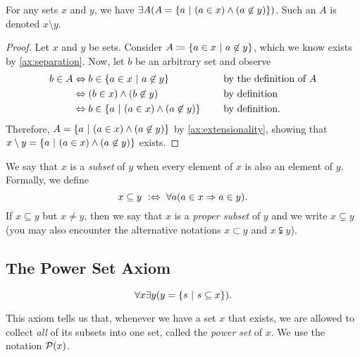 \begin{theorem}
    For any sets \(x\) and \(y\),
    we have \(\exists A \pn*{A = \set*{a \suchthat (a \in x) \meet (a \not \in y)}}\).
    Such an \(A\) is denoted \(x \setminus y\).
\end{theorem}
\begin{proof}
    Let \(x\) and \(y\) be sets.
    Consider \(A \defn \set*{a \in x \suchthat a \not \in y}\),
    which we know exists by \autoref{ax:separation}.
    Now, let \(b\) be an arbitrary set and observe
    \begin{alignat*}{2}
        b \in A &\iff b \in \set*{a \in x \suchthat a \not \in y} &&\text{by the definition of \(A\)} \\
                &\iff \pn*{b \in x} \meet \pn*{b \not \in y} &&\text{by definition} \\
                &\iff b \in \set*{a \suchthat \pn*{a \in x} \meet \pn*{a \not \in y}}~~~~&&\text{by definition}.
    \end{alignat*}
    Therefore, \(A = \set*{a \suchthat \pn*{a \in x} \meet \pn*{a \not \in y}}\) by \autoref{ax:extensionality},
    showing that \(x \setminus y = \set*{a \suchthat \pn*{a \in x} \meet \pn*{a \not \in y}}\) exists.
\end{proof}

\begin{definition}[Subsets]
    We say that \(x\) is a \emph{subset} of \(y\) when every element of \(x\) is also an element of \(y\).
    Formally, we define
    \[
        x \subseteq y \iffdefn \forall a \pn*{a \in x \implies a \in y}.
    \]
    If \(x \subseteq y\) but \(x \neq y\),
    then we say that \(x\) is a \emph{proper subset} of \(y\) and we write \(x \subsetneq y\)
    (you may also encounter the alternative notations \(x \subset y\) and \(x \subsetneqq y\)).
\end{definition}

\subsection{The Power Set Axiom}
\begin{axiom}
    \vspace{-\abovedisplayskip}
    \[
        \forall x \exists y \pn*{y = \set*{s \suchthat s \subseteq x}}.
    \]

    This axiom tells us that, whenever we have a set \(x\) that exists,
    we are allowed to collect \emph{all} of its subsets into one set, called the \emph{power set} of \(x\).
    We use the notation \(\power{x}\).
\end{axiom}

